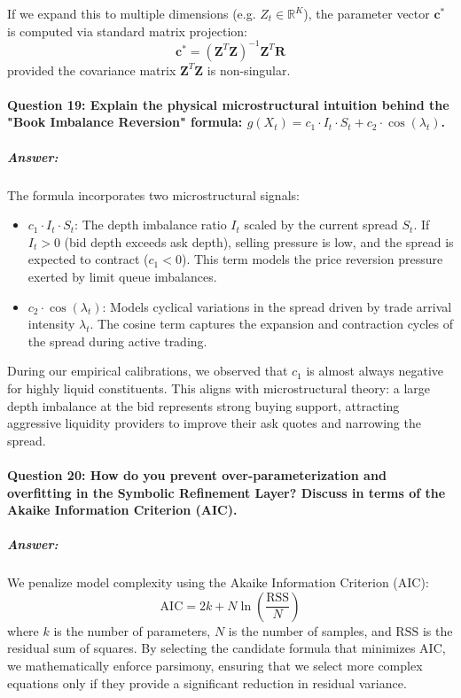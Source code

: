\documentclass[11pt,a4paper]{article}
\begin{document}
If we expand this to multiple dimensions (e.g. $Z_t \in \mathbb{R}^K$), the parameter vector $\mathbf{c}^*$ is computed via standard matrix projection:
\begin{equation}
    \mathbf{c}^* = \left( \mathbf{Z}^T \mathbf{Z} \right)^{-1} \mathbf{Z}^T \mathbf{R}
\end{equation}
provided the covariance matrix $\mathbf{Z}^T \mathbf{Z}$ is non-singular.

\paragraph{Question 19: Explain the physical microstructural intuition behind the "Book Imbalance Reversion" formula: $g(X_t) = c_1 \cdot I_t \cdot S_t + c_2 \cdot \cos(\lambda_t)$.}
\subparagraph{Answer:}
The formula incorporates two microstructural signals:
\begin{itemize}
    \item $c_1 \cdot I_t \cdot S_t$: The depth imbalance ratio $I_t$ scaled by the current spread $S_t$. If $I_t > 0$ (bid depth exceeds ask depth), selling pressure is low, and the spread is expected to contract ($c_1 < 0$). This term models the price reversion pressure exerted by limit queue imbalances.
    \item $c_2 \cdot \cos(\lambda_t)$: Models cyclical variations in the spread driven by trade arrival intensity $\lambda_t$. The cosine term captures the expansion and contraction cycles of the spread during active trading.
\end{itemize}

During our empirical calibrations, we observed that $c_1$ is almost always negative for highly liquid constituents. This aligns with microstructural theory: a large depth imbalance at the bid represents strong buying support, attracting aggressive liquidity providers to improve their ask quotes and narrowing the spread.

\paragraph{Question 20: How do you prevent over-parameterization and overfitting in the Symbolic Refinement Layer? Discuss in terms of the Akaike Information Criterion (AIC).}
\subparagraph{Answer:}
We penalize model complexity using the Akaike Information Criterion (AIC):
\begin{equation}
    \text{AIC} = 2k + N \ln\left(\frac{\text{RSS}}{N}\right)
\end{equation}
where $k$ is the number of parameters, $N$ is the number of samples, and $\text{RSS}$ is the residual sum of squares. By selecting the candidate formula that minimizes AIC, we mathematically enforce parsimony, ensuring that we select more complex equations only if they provide a significant reduction in residual variance.
\end{document}

